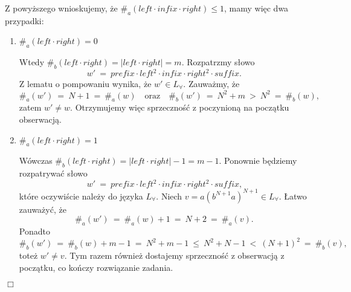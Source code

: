 \documentclass[12pt]{article}
\begin{document}
	\medskip
	
	Z powyższego wnioskujemy, że
	\(\#_{a} \left( left \cdot infix \cdot right \right) \leqslant 1\), mamy
	więc dwa przypadki:
	\begin{enumerate}
		\item \(\#_{a} \left( left \cdot right \right) = 0\)
		      
		      Wtedy \(\#_{b} \left( left \cdot right \right) = \left| left \cdot
		      right \right| = m\). Rozpatrzmy słowo
		      \[ w' \ = \ prefix \cdot left^{2} \cdot infix \cdot right^{2}
		      \cdot suffix \text{.} \]
		      Z lematu o pompowaniu wynika, że \(w' \in L_{\forall}\). Zauważmy,
		      że
		      \[ \#_{a} \left( w' \right) \ = \ N + 1 \ = \ \#_{a} \left( w
		      \right) \quad \text{oraz} \quad \#_{b} \left( w' \right) \ = \
		      N^{2} + m \ > \ N^{2} \ = \ \#_{b} \left( w \right) \text{,} \]
		      zatem \(w' \neq w\). Otrzymujemy więc sprzeczność z poczynioną
		      na początku obserwacją.
		
		\item \(\#_{a} \left( left \cdot right \right) = 1\)
		      
		      Wówczas \(\#_{b} \left( left \cdot right \right) = \left| left
		      \cdot right \right| - 1 = m - 1\). Ponownie będziemy rozpatrywać
		      słowo
		      \[ w' \ = \ prefix \cdot left^{2} \cdot infix \cdot right^{2}
		      \cdot suffix \text{,} \]
		      które oczywiście należy do języka \(L_{\forall}\). Niech \(v = a
		      \left( b^{N + 1} a \right) ^ {N + 1} \in L_{\forall}\). Łatwo
		      zauważyć, że
		      \[ \#_{a} \left( w' \right) \ = \ \#_{a} \left( w \right) + 1 \ =
		      \ N + 2 \ = \ \#_{a} \left( v \right) \text{.} \]
		      Ponadto
		      \[ \#_{b} \left( w' \right) \ = \ \#_{b} \left( w \right) + m - 1
		      \ = \ N^{2} + m - 1 \ \leqslant \ N^2 + N - 1 \ < \ \left( N + 1
		      \right) ^ {2} \ = \ \#_{b} \left( v \right) \text{,} \]
		      toteż \(w' \neq v\). Tym razem również dostajemy sprzeczność z
		      obserwacją z początku, co kończy rozwiązanie zadania.
	\end{enumerate}
	\begin{flushright}
		\(\Box\)
	\end{flushright}
\end{document}
